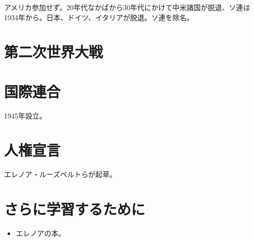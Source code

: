\documentclass[uplatex,dvipdfmx]{jsarticle}\usepackage{mystyle}
\begin{document}
アメリカ参加せず。20年代なかばから30年代にかけて中米諸国が脱退、ソ連は1934年から。日本、ドイツ、イタリアが脱退。ソ連を除名。


\section{第二次世界大戦}


\section{国際連合}

1945年設立。


\section{人権宣言}

エレノア・ルーズベルトらが起草。








\section{さらに学習するために}

\begin{itemize}
\item エレノアの本。
\end{itemize}


\ifx\mybook\undefined
  

\end{document}
